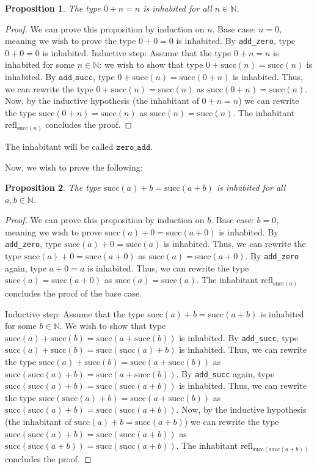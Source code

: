 \documentclass[12pt]{article}
\newtheorem{proposition}{Proposition}[section]
\theoremstyle{definition}
\theoremstyle{remark}
\begin{document}
\begin{proposition}
  The type $0 + n = n$ is inhabited for all $n \in \mathbb{N}$.
\end{proposition}
\begin{proof}
  We can prove this proposition by induction on $n$. Base case: $n = 0$, meaning we wish to prove the type $0 + 0 = 0$ is inhabited. By \texttt{add\_zero}, type $0 + 0 = 0$ is inhabited. Inductive step: Assume that the type $0 + n = n$ is inhabited for some $n \in \mathbb{N}$: we wish to show that type $0 + \text{succ}(n) = \text{succ}(n)$ is inhabited. By $\texttt{add\_succ}$, type $0 + \text{succ}(n) = \text{succ}(0 + n)$ is inhabited. Thus, we can rewrite the type $0 + \text{succ}(n) = \text{succ}(n)$ as $\text{succ}(0 + n) = \text{succ}(n)$. Now, by the inductive hypothesis (the inhabitant of $0 + n = n$) we can rewrite the type $\text{succ}(0 + n) = \text{succ}(n)$ as $\text{succ}(n) = \text{succ}(n)$.
  The inhabitant $\text{refl}_{\text{succ}(n)}$ concludes the proof.
\end{proof}

The inhabitant will be called $\texttt{zero\_add}$.

Now, we wish to prove the following:

\begin{proposition}
  The type $\text{succ}(a) + b = \text{succ}(a+b)$ is inhabited for all $a, b \in \mathbb{N}$.
\end{proposition}
\begin{proof}
  We can prove this proposition by induction on $b$. Base case: $b = 0$, meaning we wish to prove $\text{succ} (a) + 0 = \text{succ} (a+0)$ is inhabited. By \texttt{add\_zero}, type $\text{succ}(a) + 0 = \text{succ}(a)$ is inhabited. Thus, we can rewrite the type $\text{succ} (a) + 0 = \text{succ} (a+0)$ as $\text{succ}(a) = \text{succ}(a+0)$. By \texttt{add\_zero} again, type $a+0=a$ is inhabited. Thus, we can rewrite the type $\text{succ}(a) = \text{succ}(a+0)$ as $\text{succ}(a) = \text{succ}(a)$. The inhabitant $\text{refl}_{\text{succ}(a)}$ concludes the proof of the base case.
  
  Inductive step: Assume that the type $\text{succ}(a) + b = \text{succ}(a+b)$ is inhabited for some $b \in \mathbb{N}$. We wish to show that type $\text{succ}(a) + \text{succ}(b) = \text{succ}(a+\text{succ}(b))$ is inhabited. By \texttt{add\_succ}, type $\text{succ}(a) + \text{succ}(b) = \text{succ}(\text{succ}(a) + b)$ is inhabited. Thus, we can rewrite the type $\text{succ}(a) + \text{succ}(b) = \text{succ}(a+\text{succ}(b))$ as $\text{succ}(\text{succ}(a) + b) = \text{succ}(a+\text{succ}(b))$. By \texttt{add\_succ} again, type $\text{succ}(\text{succ}(a)+b) = \text{succ}(\text{succ}(a+b))$ is inhabited. Thus, we can rewrite the type $\text{succ}(\text{succ}(a) + b) = \text{succ}(a+\text{succ}(b))$ as $\text{succ}(\text{succ}(a)+b) = \text{succ}(\text{succ}(a+b))$. Now, by the inductive hypothesis (the inhabitant of $\text{succ}(a) + b = \text{succ}(a+b)$) we can rewrite the type $\text{succ}(\text{succ}(a) + b) = \text{succ}(\text{succ}(a+b))$ as $\text{succ}(\text{succ}(a+b)) = \text{succ}(\text{succ}(a+b))$.
  The inhabitant $\text{refl}_{\text{succ}(\text{succ}(a+b))}$ concludes the proof.
\end{proof}
\end{document}
